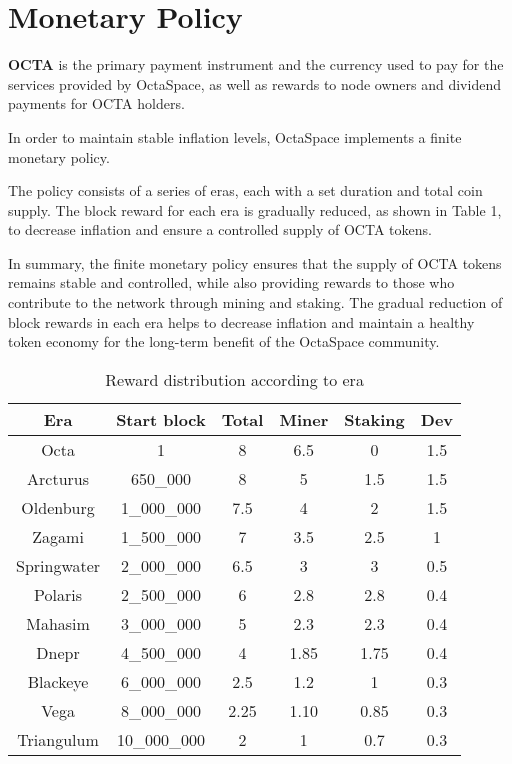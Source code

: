 \section{Monetary Policy}
\label{sec:mp}

\textbf{OCTA} is the primary payment instrument and the currency used to pay for the services provided by OctaSpace, as well as rewards to node owners and dividend payments for OCTA holders.

In order to maintain stable inflation levels, OctaSpace implements a finite monetary policy.

The policy consists of a series of eras, each with a set duration and total coin supply. The block reward for each era is gradually reduced, as shown in Table 1, to decrease inflation and ensure a controlled supply of OCTA tokens.


In summary, the finite monetary policy ensures that the supply of OCTA tokens remains stable and controlled, while also providing rewards to those who contribute to the network through mining and staking. The gradual reduction of block rewards in each era helps to decrease inflation and maintain a healthy token economy for the long-term benefit of the OctaSpace community.

\begin{table}[h!]
\centering
\begin{tabular}{||c c c c c c||}
    \hline
        Era & Start block & Total & Miner & Staking & Dev \\ [0.5ex]

        \hline\hline
        Octa & 1 & 8 & 6.5 & 0 & 1.5 \\
        Arcturus & 650\_000 & 8 & 5 & 1.5 & 1.5 \\
        Oldenburg & 1\_000\_000 & 7.5 & 4 & 2 & 1.5 \\
        Zagami & 1\_500\_000 & 7 & 3.5 & 2.5 & 1 \\
        Springwater & 2\_000\_000 & 6.5 & 3 & 3 & 0.5 \\
        Polaris & 2\_500\_000 & 6 & 2.8 & 2.8 & 0.4 \\
        Mahasim & 3\_000\_000 & 5 & 2.3 & 2.3 & 0.4 \\
        Dnepr & 4\_500\_000 & 4 & 1.85 & 1.75 & 0.4 \\
        Blackeye & 6\_000\_000 & 2.5 & 1.2 & 1 & 0.3 \\
        Vega & 8\_000\_000 & 2.25 & 1.10 & 0.85 & 0.3 \\
        Triangulum & 10\_000\_000 & 2 & 1 & 0.7 & 0.3 \\[1ex]
    \hline

\end{tabular}
\caption{Reward distribution according to era}
\label{table:1}
\end{table}

